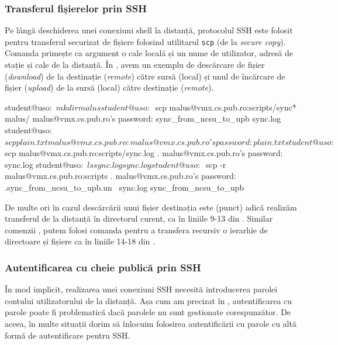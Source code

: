 \subsubsection{Transferul fișierelor prin SSH}
\label{sec:sec:transfer:ssh:transfer}

Pe lângă deschiderea unei conexiuni shell la distanță, protocolul SSH este folosit pentru transferul securizat de fișiere folosind utilitarul \texttt{scp} (de la \textit{secure copy}). Comanda  primește ca argument o cale locală și un nume de utilizator, adresă de stație și cale de la distanță. În , avem un exemplu de descărcare de fișier (\textit{download}) de la destinație (\textit{remote}) către sursă (local) și unul de încărcare de fișier (\textit{upload}) de la sursă (local) către destinație (\textit{remote}).

\begin{screen}[caption={Transfer de fișiere prin SSH (scp)},label={lst:sec:scp}]
student@uso:~$ mkdir malus
student@uso:~$ scp malus@vmx.cs.pub.ro:scripts/sync* malus/
malus@vmx.cs.pub.ro's password:
sync_from_ncsu_to_upb
sync.log
student@uso:~$ scp plain.txt malus@vmx.cs.pub.ro:
malus@vmx.cs.pub.ro's password:
plain.txt
student@uso:~$ scp malus@vmx.cs.pub.ro:scripts/sync.log .
malus@vmx.cs.pub.ro's password:
sync.log
student@uso:~$ ls sync.log
sync.log
student@uso:~$ scp -r malus@vmx.cs.pub.ro:scripts .
malus@vmx.cs.pub.ro's password:
.sync_from_ncsu_to_upb.un~
sync.log
sync_from_ncsu_to_upb
\end{screen}

De multe ori în cazul descărcării unui fișier destinația este  (punct) adică realizăm transferul de la distanță în directorul curent, ca în liniile 9-13 din . Similar comenzii , putem folosi comanda  pentru a transfera recursiv o ierarhie de directoare și fișiere ca în liniile 14-18 din .

\subsubsection{Autentificarea cu cheie publică prin SSH}
\label{sec:sec:transfer:ssh:pub-auth}

În mod implicit, realizarea unei conexiuni SSH necesită introducerea parolei contului utilizatorului de la distanță.
Așa cum am precizat în , autentificarea cu parole poate fi problematică dacă parolele nu sunt gestionate corespunzător.
De aceea, în multe situații dorim să înlocuim folosirea autentificării cu parole cu altă formă de autentificare pentru SSH.

